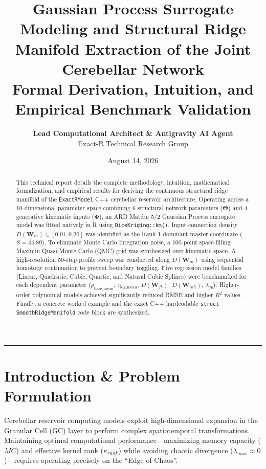 \documentclass[11pt,a4paper]{article}
\title{\Huge \textbf{\color{navyblue} Gaussian Process Surrogate Modeling and Structural Ridge Manifold Extraction of the Joint Cerebellar Network}\\[0.4em]
\large Formal Derivation, Intuition, and Empirical Benchmark Validation}
\author{\textbf{Lead Computational Architect \& Antigravity AI Agent} \\ Exact-R Technical Research Group}
\date{August 14, 2026}
\begin{document}
\maketitle

\begin{abstract}
This technical report details the complete methodology, intuition, mathematical formalization, and empirical results for deriving the continuous structural ridge manifold of the \texttt{ExactRModel} C++ cerebellar reservoir architecture. Operating across a 10-dimensional parameter space combining 6 structural network parameters ($\boldsymbol{\Theta}$) and 4 generative kinematic inputs ($\boldsymbol{\Phi}$), an ARD Mat\'ern 5/2 Gaussian Process surrogate model was fitted natively in R using \texttt{DiceKriging::km()}. Input connection density $D(\mathbf{W}_{in}) \in [0.01, 0.20]$ was identified as the Rank-1 dominant master coordinate ($S = 44.89$). To eliminate Monte Carlo Integration noise, a 100-point space-filling Maximin Quasi-Monte Carlo (QMC) grid was synthesized over kinematic space. A high-resolution 50-step profile sweep was conducted along $D(\mathbf{W}_{in})$ using sequential homotopy continuation to prevent boundary toggling. Five regression model families (Linear, Quadratic, Cubic, Quartic, and Natural Cubic Splines) were benchmarked for each dependent parameter ($\rho_{\text{base\_mean}}$, $\tau_{\text{log\_mean}}$, $D(\mathbf{W}_{fb})$, $D(\mathbf{W}_{inh})$, $\lambda_{fb}$). Higher-order polynomial models achieved significantly reduced RMSE and higher $R^2$ values. Finally, a concrete worked example and the exact C++ hardcodable \texttt{struct SmoothRidgeManifold} code block are synthesized.
\end{abstract}

\vspace{0.8em}
\hrule
\vspace{0.8em}

\section{Introduction \& Problem Formulation}

Cerebellar reservoir computing models exploit high-dimensional expansion in the Granular Cell (GC) layer to perform complex spatiotemporal transformations. Maintaining optimal computational performance—maximizing memory capacity ($MC$) and effective kernel rank ($\kappa_{rank}$) while avoiding chaotic divergence ($\lambda_{max} \approx 0$)—requires operating precisely on the ``Edge of Chaos''.
\end{document}
